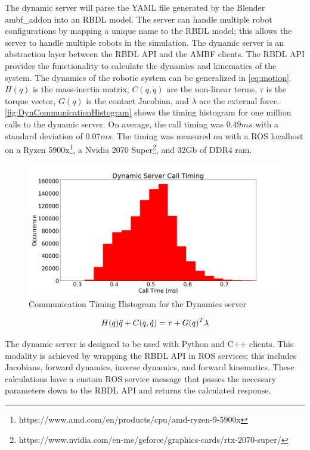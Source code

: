  The dynamic server will parse the YAML file generated by the Blender ambf\_addon into an RBDL model. The server can handle multiple robot configurations by mapping a unique name to the RBDL model; this allows the server to handle multiple robots in the simulation. 
 The dynamic server is an abstraction layer between the RBDL API and the AMBF clients. The RBDL API provides the functionality to calculate the dynamics and kinematics of the system. The dynamics of the robotic system can be generalized in  \autoref{eq:motion}. $H(q)$ is the mass-inertia matrix, $C(q,\Dot{q})$ are the non-linear terms, $\tau$ is the torque vector,  $G(q)$ is the contact Jacobian, and $\lambda$ are the external force. \autoref{fig:DynCommunicationHistogram} shows the timing histogram for one million calls to the dynamic server. On average, the call timing was $0.49ms$ with a standard deviation of $0.07ms$.  The timing was measured on with a ROS localhost on a Ryzen 5900x\footnote{https://www.amd.com/en/products/cpu/amd-ryzen-9-5900x}, a Nvidia 2070 Super\footnote{https://www.nvidia.com/en-me/geforce/graphics-cards/rtx-2070-super/}, and 32Gb of DDR4 ram.  


 \begin{figure}
     \centering
     \includegraphics[scale=0.35]{images/software/dyn_loop_timing.png}
     \caption[Dynamic Timing Histogram]{Communication Timing Histogram for the Dynamics server}
     \label{fig:DynCommunicationHistogram}
 \end{figure}
 


\begin{equation}
\Large
    H(q) \Ddot{q} + C(q,\Dot{q}) = \tau + G(q)^T \lambda
    \label{eq:motion}
\end{equation}



The dynamic server is designed to be used with Python and C++ clients. This modality is achieved by wrapping the RBDL API in ROS services; this includes Jacobians, forward dynamics, inverse dynamics, and forward kinematics. These calculations have a custom ROS service message that passes the necessary parameters down to the RBDL API and returns the calculated response. 

